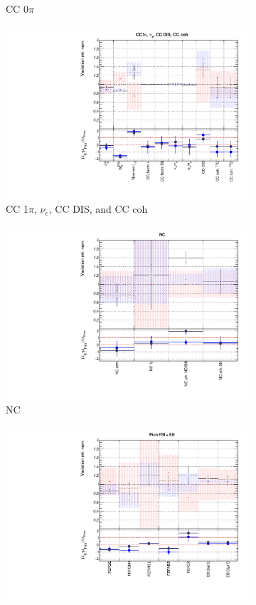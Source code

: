 \begin{figure}[t]
\begin{subfigure}{0.49\textwidth}
  \caption{CC 0$\pi$}
\end{subfigure}
\begin{subfigure}{0.49\textwidth}
  \centering
  \includegraphics[width=0.95\linewidth]{figs/rhcmpdatxsec28_2}
  \caption{CC 1$\pi$, $\nu_e$, CC DIS, and CC coh}
\end{subfigure}
\begin{subfigure}{0.49\textwidth}
  \centering
  \includegraphics[width=0.95\linewidth]{figs/rhcmpdatxsec28_3}
  \caption{NC}
\end{subfigure}
\begin{subfigure}{0.49\textwidth}
  \centering
  \includegraphics[width=0.95\linewidth]{figs/rhcmpdatxsec28_4}

\end{subfigure}
\end{figure}
